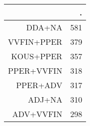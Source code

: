 \begin{tabular}{rr}
  \hline
 & . \\ 
  \hline
DDA+NA & 581 \\ 
  VVFIN+PPER & 379 \\ 
  KOUS+PPER & 357 \\ 
  PPER+VVFIN & 318 \\ 
  PPER+ADV & 317 \\ 
  ADJ+NA & 310 \\ 
  ADV+VVFIN & 298 \\ 
   \hline
\end{tabular}
